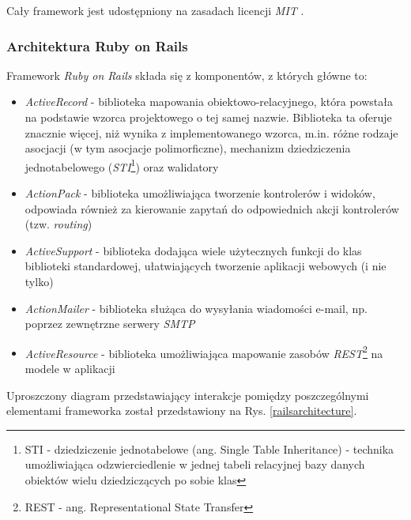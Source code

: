 \documentclass[a4paper,12pt]{article}
\providecommand{\imref}[1]{Rys. \ref{#1}} %
\begin{document}
Cały framework jest udostępniony na zasadach licencji \emph{MIT}
\cite{mit}.

\subsubsection{Architektura Ruby on Rails}
Framework \emph{Ruby on Rails} składa się z komponentów, z których
główne to:

\begin{itemize}
\item \emph{ActiveRecord} - biblioteka mapowania
  obiektowo-relacyjnego, która powstała na podstawie wzorca
  projektowego o tej samej nazwie. Biblioteka ta oferuje znacznie
  więcej, niż wynika z implementowanego wzorca, m.in. różne rodzaje
  asocjacji (w tym asocjacje polimorficzne), mechanizm dziedziczenia
  jednotabelowego (\emph{STI}\footnote{STI - dziedziczenie
    jednotabelowe (ang. Single Table Inheritance) - technika
    umożliwiająca odzwierciedlenie w jednej tabeli relacyjnej bazy
    danych obiektów wielu dziedziczących po sobie klas})
  oraz walidatory
\item \emph{ActionPack} - biblioteka umożliwiająca tworzenie
  kontrolerów i widoków, odpowiada również za kierowanie zapytań do
  odpowiednich akcji kontrolerów (tzw. \emph{routing})
\item \emph{ActiveSupport} - biblioteka dodająca wiele użytecznych
  funkcji do klas biblioteki standardowej, ułatwiających tworzenie
  aplikacji webowych (i nie tylko)
\item \emph{ActionMailer} - biblioteka służąca do wysyłania wiadomości
  e-mail, np. poprzez zewnętrzne serwery \emph{SMTP}
\item \emph{ActiveResource} - biblioteka umożliwiająca mapowanie
  zasobów \emph{REST}\footnote{REST - ang. Representational State
    Transfer} na modele w aplikacji
\end{itemize}

Uproszczony diagram przedstawiający interakcje pomiędzy poszczególnymi
elementami frameworka został przedstawiony na
\imref{railsarchitecture}.
\end{document}
